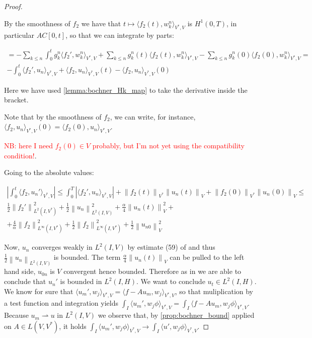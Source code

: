 \documentclass[english,a4paper,10pt,oneside]{scrbook}	%
\theoremstyle{break}
\newenvironment{mproof}[1][\proofname]{%
  \begin{proof}[#1]$ $\par\nobreak\ignorespaces
}{%
  \end{proof}
}
\renewcommand*{\proofname}{Proof}
\theoremstyle{remark}
\newcommand{\norm}[1]{\left\lVert#1\right\rVert}
\newcommand{\VN}[1]{\norm{#1}_{V}}
\newcommand{\VSN}[1]{\norm{#1}_{V^*}}
\newcommand{\tred}[1]{\textcolor{red}{#1}}
\begin{document}
\begin{mproof}
By the smoothness of $f_2$ we have that $t \mapsto \langle f_2(t),w_k^n \rangle_{V^*,V}$ is $H^1(0,T)$, in particular $AC[0,t]$, so that we can integrate by parts:

\begin{align*}
	 = - \sum_{k\leq n}\int_0^tg_k^{n}\langle f_2',w_k^n \rangle_{V^*,V} + \sum_{k\leq n} g_k^{n}(t)\langle f_2(t),w_k^n \rangle_{V^*,V} - \sum_{k\leq n} g_k^{n}(0)\langle f_2(0),w_k^n \rangle_{V^*,V} = \\
	 -\int_0^t \langle f_2',u_n \rangle_{V^*,V} + \langle f_2,u_n \rangle_{V^*,V}(t)-\langle f_2,u_n \rangle_{V^*,V}(0)
\end{align*}

Here we have used \cref{lemma:bochner_Hk_map} to take the derivative inside the bracket.

Note that by the smoothness of $f_2$, we can write, for instance, $\langle f_2,u_n \rangle_{V^*,V}(0) = \langle f_2(0),u_n \rangle_{V^*,V}$.

\tred{NB: here I need $f_2(0) \in V$ probably, but I'm not yet using the compatibility condition!}.

Going to the absolute values:

\begin{align*}
	\left | \int_0^t \langle f_2,u_n' \rangle_{V^*,V}\right | \leq 
	\int_0^T |\langle f_2',u_n \rangle_{V^*,V}|+ \VSN{f_2(t)}\VN{u_n(t)}+\VSN{f_2(0)}\VN{u_n(0)} \leq \\
	\frac{1}{2}\norm{f_2'}_{L^2(I,V^*)}^2 + \frac{1}{2}\norm{u_n}_{L^2(I,V)}^2 + \frac{\alpha}{4}\VN{u_n(t)}^2 +\\
	+ \frac{4}{\alpha}\norm{f_2}_{L^\infty(I,V^*)}^2+ \frac{1}{2}\norm{f_2}_{L^\infty(I,V^*)}^2+\frac{1}{2}\VN{u_{n0}}^2
\end{align*}

Now, $u_n$ converges weakly in $L^2(I,V)$ by estimate (59) of \cite{gilardi} and thus $\frac{1}{2}\norm{u_n}_{L^2(I,V)}$ is bounded. The term $\frac{\alpha}{4}\VN{u_n(t)}$ can be pulled to the left hand side, $u_{0n}$ is $V$ convergent hence bounded. Therefore as in \cite{gilardi} we are able to conclude that $u_n'$ is bounded in $L^2(I,H)$. We want to conclude $u_t \in L^2(I,H)$. We know for sure that $\langle u_m',w_j\rangle_{V^*,V}=\langle f-Au_m,w_j\rangle_{V^*,V}$, so that muliplication by a test function and integration yields $\int_I \langle u_m',w_j\phi\rangle_{V^*,V}=\int_I \langle f-Au_m,w_j\phi\rangle_{V^*,V}$. Because $u_m\rightharpoonup u$ in $L^2(I,V)$ we observe that, by \cref{prop:bochner_bound} applied on $A \in L(V,V^*)$, it holds $\int_I \langle u_m',w_j\phi\rangle_{V^*,V}\rightarrow \int_I \langle u',w_j\phi\rangle_{V^*,V}$.


\end{mproof}
\end{document}
